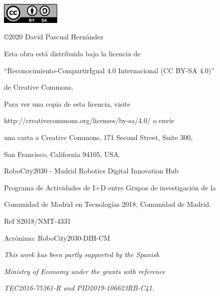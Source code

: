 \begin{flushright}
	
	\includegraphics[height=1.0cm]{figures/CC-BY-SA.png}
	
	\vspace*{0.5cm}
	
	\copyright 2020 David Pascual Hernández
	
	\vspace*{0.3cm}
	
	Esta obra está distribuida bajo la licencia de 
	
	``Reconocimiento-CompartirIgual 4.0 Internacional (CC BY-SA 4.0)''
	
	de Creative Commons.
	
	\vspace{0.2cm}
	
	Para ver una copia de esta licencia, visite
	
	http://creativecommons.org/licenses/by-sa/4.0/ o envíe
	
	una carta a Creative Commons, 171 Second Street, Suite 300,
	
	San Francisco, California 94105, USA.
	
\end{flushright}


\pagebreak
\thispagestyle{empty}
\vspace*{12cm}

\begin{flushright}
	
RoboCity2030 - Madrid Robotics Digital Innovation Hub

Programa de Actividades de I+D entre Grupos de investigación de la

Comunidad de Madrid en Tecnologías 2018, Comunidad de Madrid.

Ref S2018/NMT-4331

Acrónimo: RoboCity2030-DIH-CM

\vspace{1cm}

\emph{This work has been partly supported by the Spanish}

\emph{Ministry of Economy under the grants with reference}

\emph{TEC2016-75361-R and PID2019-106623RB-C41.}

\end{flushright}